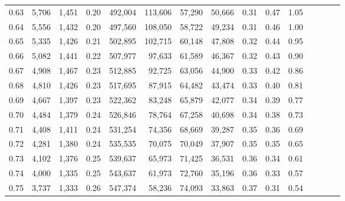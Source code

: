 \begin{tabular}{rrrcrrrrrrrrrrr}
0.63 &   5,706 &  1,451 &                                       0.20 &  492,004 &  113,606 &   57,290 &   50,666 &  0.31 &  0.47 &                         1.05 \\
0.64 &   5,556 &  1,432 &                                       0.20 &  497,560 &  108,050 &   58,722 &   49,234 &  0.31 &  0.46 &                         1.00 \\
0.65 &   5,335 &  1,426 &                                       0.21 &  502,895 &  102,715 &   60,148 &   47,808 &  0.32 &  0.44 &                         0.95 \\
0.66 &   5,082 &  1,441 &                                       0.22 &  507,977 &   97,633 &   61,589 &   46,367 &  0.32 &  0.43 &                         0.90 \\
0.67 &   4,908 &  1,467 &                                       0.23 &  512,885 &   92,725 &   63,056 &   44,900 &  0.33 &  0.42 &                         0.86 \\
0.68 &   4,810 &  1,426 &                                       0.23 &  517,695 &   87,915 &   64,482 &   43,474 &  0.33 &  0.40 &                         0.81 \\
0.69 &   4,667 &  1,397 &                                       0.23 &  522,362 &   83,248 &   65,879 &   42,077 &  0.34 &  0.39 &                         0.77 \\
0.70 &   4,484 &  1,379 &                                       0.24 &  526,846 &   78,764 &   67,258 &   40,698 &  0.34 &  0.38 &                         0.73 \\
0.71 &   4,408 &  1,411 &                                       0.24 &  531,254 &   74,356 &   68,669 &   39,287 &  0.35 &  0.36 &                         0.69 \\
0.72 &   4,281 &  1,380 &                                       0.24 &  535,535 &   70,075 &   70,049 &   37,907 &  0.35 &  0.35 &                         0.65 \\
0.73 &   4,102 &  1,376 &                                       0.25 &  539,637 &   65,973 &   71,425 &   36,531 &  0.36 &  0.34 &                         0.61 \\
0.74 &   4,000 &  1,335 &                                       0.25 &  543,637 &   61,973 &   72,760 &   35,196 &  0.36 &  0.33 &                         0.57 \\
0.75 &   3,737 &  1,333 &                                       0.26 &  547,374 &   58,236 &   74,093 &   33,863 &  0.37 &  0.31 &                         0.54 \\

\end{tabular}
